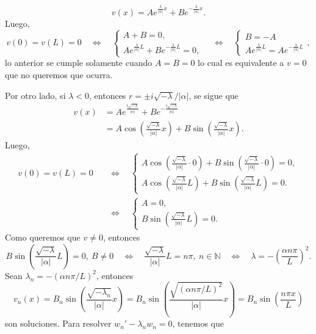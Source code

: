 \documentclass[12pt]{article}
\newcommand{\N}{\mathbb{N}}
\newcommand{\pp}[1]{\left( #1 \right)}
\newcommand{\Ssi}{\quad\Longleftrightarrow\quad}
\renewcommand{\l}{\lambda}
\renewcommand{\a}{\alpha}
\begin{document}
\begin{enumerate}
\begin{enumerate}
            \[v(x)=Ae^{\tfrac{\l}{|\a|}x}+B e^{-\tfrac{\l}{|\a|}x}.\]
            Luego,
            \[v(0)=v(L)=0\Ssi
            \begin{cases}
                A+B =0,\\
                Ae^{\tfrac{\l}{|\a|}L}+B e^{-\tfrac{\l}{|\a|}L}=0,
            \end{cases}
            \Ssi
            \begin{cases}
                B=-A\\
                Ae^{\tfrac{\l}{|\a|}L}=A e^{-\tfrac{\l}{|\a|}L}
            \end{cases},
            \]
            lo anterior se cumple solamente cuando $A=B=0$ lo cual es equivalente a $v=0$ que no queremos que ocurra.

            Por otro lado, si $\l<0$, entonces $r=\pm i\sqrt{-\l}/|\a|$, se sigue que
            \begin{align*}
                v(x) &= Ae^{\frac{i\sqrt{-\l}}{|\a|}}+Be^{-\frac{i\sqrt{-\l}}{|\a|}}\\
                &=A\cos\pp{\frac{\sqrt{-\l}}{|\a|}x}+B\sin\pp{\frac{\sqrt{-\l}}{|\a|}x}.
            \end{align*}
            Luego,
            \begin{align*}
                v(0)=v(L)=0 &\Ssi \begin{cases}
                    A\cos\pp{\frac{\sqrt{-\l}}{|\a|}\cdot 0}+B\sin\pp{\frac{\sqrt{-\l}}{|\a|}\cdot 0}=0,\\
                    A\cos\pp{\frac{\sqrt{-\l}}{|\a|}L}+B\sin\pp{\frac{\sqrt{-\l}}{|\a|}L}=0.
                \end{cases}\\
                &\Ssi\begin{cases}
                    A=0,\\
                    B\sin\pp{\frac{\sqrt{-\l}}{|\a|}L}=0.
                \end{cases}
            \end{align*}
            Como queremos que $v\neq 0$, entonces
            \[ B\sin\pp{\frac{\sqrt{-\l}}{|\a|}L}=0,~ B\neq 0\Ssi \frac{\sqrt{-\l}}{|\a|}L=n\pi,~n\in\N \Ssi \l=-\pp{\frac{\a n\pi}{L}}^2. \]
            Sean $\l_n=-\pp{\a n\pi/L}^2$, entonces
            \[ v_n(x)=B_n\sin\pp{\frac{\sqrt{-\l_n}}{|\a|}x}=B_n\sin\pp{\frac{\sqrt{\pp{\a n\pi/L}^2}}{|\a|}x}=B_n\sin\pp{\frac{n\pi x}{L}} \]
            son soluciones.
            Para resolver ${w_n}'-\l_n w_n=0$, tenemos que
            \begin{align*}

\end{align*}
\end{enumerate}
\end{enumerate}
\end{document}
